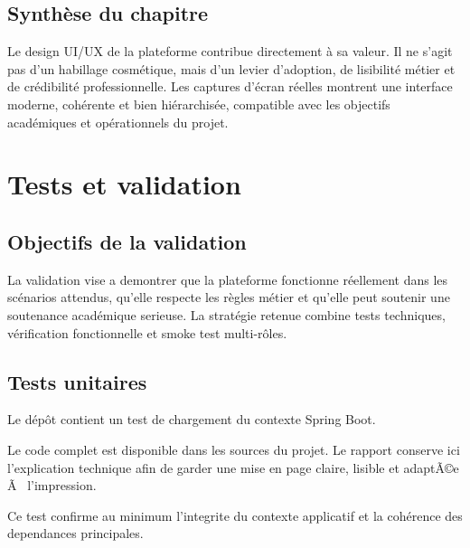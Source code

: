 ﻿\documentclass[12pt,a4paper,oneside]{report}
\newenvironment{codeblock}[1][]{
  \par
  \captionsetup{type=figure}
}{
  \par
}
\begin{document}
\section{Synthèse du chapitre}
Le design UI/UX de la plateforme contribue directement à sa valeur. Il ne s'agit pas d'un habillage cosmétique, mais d'un levier d'adoption, de lisibilité métier et de crédibilité professionnelle. Les captures d'écran réelles montrent une interface moderne, cohérente et bien hiérarchisée, compatible avec les objectifs académiques et opérationnels du projet.










\chapter{Tests et validation}
\label{chap:tests}

\section{Objectifs de la validation}
La validation vise a demontrer que la plateforme fonctionne réellement dans les scénarios attendus, qu'elle respecte les règles métier et qu'elle peut soutenir une soutenance académique serieuse. La stratégie retenue combine tests techniques, vérification fonctionnelle et smoke test multi-rôles.

\section{Tests unitaires}
Le dépôt contient un test de chargement du contexte Spring Boot.

\begin{codeblock}[H]
\caption{Test automatise de chargement du contexte Spring Boot}
\begin{keybox}
Le code complet est disponible dans les sources du projet. Le rapport conserve ici l'explication technique afin de garder une mise en page claire, lisible et adaptÃ©e Ã  l'impression.
\end{keybox}
\end{codeblock}

Ce test confirme au minimum l'integrite du contexte applicatif et la cohérence des dependances principales.
\end{document}

